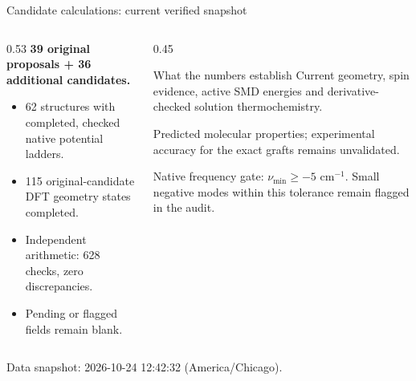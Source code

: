 \begin{frame}{Candidate calculations: current verified snapshot}
\begin{columns}[T]\begin{column}{0.53\textwidth}
\textbf{39 original proposals + 36 additional candidates.}
\begin{itemize}
\item 62 structures with completed, checked native potential ladders.
\item 115 original-candidate DFT geometry states completed.
\item Independent arithmetic: 628 checks, zero discrepancies.
\item Pending or flagged fields remain blank.
\end{itemize}
\end{column}\begin{column}{0.45\textwidth}
\begin{block}{What the numbers establish}
Current geometry, spin evidence, active SMD energies and derivative-checked solution thermochemistry.
\end{block}
\footnotesize Predicted molecular properties; experimental accuracy for the exact grafts remains unvalidated.
\par\vspace{1ex}\scriptsize Native frequency gate: $\nu_{\min}\geq-5$ cm$^{-1}$. Small negative modes within this tolerance remain flagged in the audit.
\end{column}\end{columns}
\vfill\scriptsize Data snapshot: 2026-10-24 12:42:32 (America/Chicago).
\end{frame}

